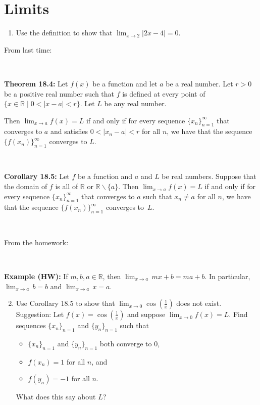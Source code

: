 \documentclass[12pt]{amsart}
\newcommand{\R}{\mathbb{R}}
\newcommand{\ds}{\displaystyle}
\begin{document}
	
	\thispagestyle{empty}
	
	\section*{Limits}

\begin{enumerate}
\item Use the definition to show that $\lim_{x\to 2}  | 2x-4 | = 0$.
\end{enumerate}

\begin{framed}
\noindent From last time:

\

\noindent \textbf{Theorem 18.4:}  Let $f(x)$ be a function and let $a$ be a real number.
  Let $r > 0$ be a positive real number such that
  $f$ is defined
  at every point of $\{x \in \R \mid 0 < |x-a| < r\}$.
    Let $L$ be any real number. 

Then $\lim_{x \to a} f(x) = L$ if and only if for every sequence 
$\{x_n\}_{n=1}^\infty$ that converges to $a$ and satisfies $0 < |x_n - a| < r$ for all $n$, we have that the sequence $\{f(x_n)\}_{n=1}^\infty$ converges to $L$. 

\

\noindent \textbf{Corollary 18.5:}   Let $f$ be a function and $a$ and $L$ be real numbers. Suppose that the domain of $f$ is all of $\R$ or $\R \smallsetminus \{ a\}$. Then $\lim_{x \to a} f(x) = L$ if and only if for every sequence 
	$\{x_n\}_{n=1}^\infty$ that converges to $a$ such that $x_n\neq a$ for all $n$, we have that the sequence $\{f(x_n)\}_{n=1}^\infty$ converges to~$L$. 
	
	\
	
\noindent	From the homework:

\
	
	\noindent \textbf{Example (HW):} If $m,b,a\in \R$, then $\lim_{x\to a} \, mx+b = ma+b$. In particular, $\lim_{x\to a} \, b = b$ and $\lim_{x\to a} \, x = a$.
\end{framed}

\begin{enumerate} \setcounter{enumi}{1}

\item Use Corollary 18.5 to show that $\ds \lim_{x\to 0} \cos\left(\frac{1}{x}\right)$ does not exist.\\
Suggestion: Let $f(x)= \cos(\frac{1}{x})$ and suppose $\lim_{x\to 0} f(x) = L$. Find sequences $\{x_n\}_{n=1}$  and $\{y_n\}_{n=1}$ such that
\begin{itemize}
\item  $\{x_n\}_{n=1}$ and $\{y_n\}_{n=1}$ both converge to $0$,
\item $f(x_n)=1$ for all $n$, and
\item $f(y_n)=-1$ for all $n$.
\end{itemize}
What does this say about $L$?

\end{enumerate}
\end{document}
